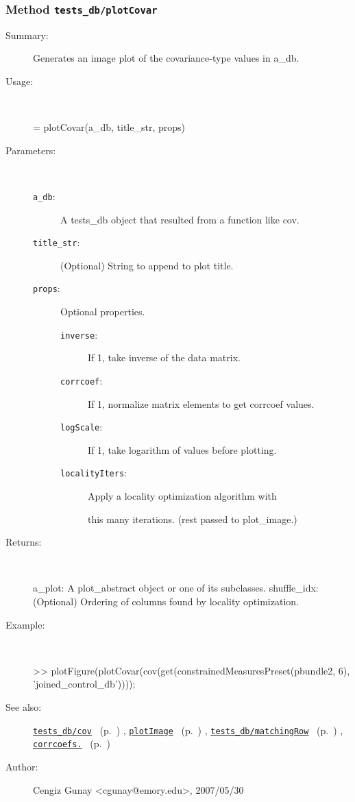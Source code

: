 \subsubsection[Method \texttt{plotCovar}]{Method \texttt{tests\_db/plotCovar}}%
%
\label{ref_tests_db__plotCovar}%
\hypertarget{ref_tests_db__plotCovar}{}%
\begin{description}
\item[Summary:]Generates an image plot of the covariance-type values in a\_db.
%
\item[Usage:]~%
\begin{lyxcode}%
[a\_plot, shuffle\_idx] = plotCovar(a\_db, title\_str, props)
%
\end{lyxcode}%
%
%
\item[Parameters:]~
\begin{description}%
\item[\texttt{a\_db}:]
 A tests\_db object that resulted from a function like cov.
\item[\texttt{title\_str}:]
 (Optional) String to append to plot title.
\item[\texttt{props}:]
 Optional properties.
\begin{description}%
\item[\texttt{inverse}:]
 If 1, take inverse of the data matrix.
\item[\texttt{corrcoef}:]
 If 1, normalize matrix elements to get corrcoef values.
\item[\texttt{logScale}:]
 If 1, take logarithm of values before plotting.
\item[\texttt{localityIters}:]
 Apply a locality optimization algorithm with

this many iterations.
(rest passed to plot\_image.)
\end{description}%
\end{description}%
%
\item[Returns:
]~

	a\_plot: A plot\_abstract object or one of its subclasses.
       shuffle\_idx: (Optional) Ordering of columns found by locality optimization.
%
\item[Example:]~
\begin{lyxcode} >> plotFigure(plotCovar(cov(get(constrainedMeasuresPreset(pbundle2, 6), 'joined\_control\_db'))));
\\%
\end{lyxcode}
%
\item[See also:]%
\hyperlink{ref_tests_db__cov}{\texttt{tests\_db/cov}}%
\ (p.~\pageref{ref_tests_db__cov})%
%
, \hyperlink{ref_plotImage}{\texttt{plotImage}}%
\ (p.~\pageref{ref_plotImage})%
%
, \hyperlink{ref_tests_db__matchingRow}{\texttt{tests\_db/matchingRow}}%
\ (p.~\pageref{ref_tests_db__matchingRow})%
%
, \hyperlink{ref_corrcoefs.}{\texttt{corrcoefs.}}%
\ (p.~\pageref{ref_corrcoefs.})%
%
%
\item[Author:]%
Cengiz Gunay <cgunay@emory.edu>, 2007/05/30
%
\end{description}
\methodline%
